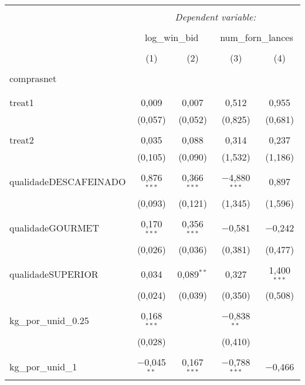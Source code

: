 
\begin{table}[!htbp] \centering 
  \caption{} 
  \label{} 
\begin{tabular}{@{\extracolsep{5pt}}lcccc} 
\\[-1.8ex]\hline 
\hline \\[-1.8ex] 
 & \multicolumn{4}{c}{\textit{Dependent variable:}} \\ 
\cline{2-5} 
\\[-1.8ex] & \multicolumn{2}{c}{log\_win\_bid} & \multicolumn{2}{c}{num\_forn\_lances} \\ 
\\[-1.8ex] & (1) & (2) & (3) & (4)\\ 
\hline \\[-1.8ex] 
 comprasnet &  &  &  &  \\ 
  &  &  &  &  \\ 
  & & & & \\ 
 treat1 & 0,009 & 0,007 & 0,512 & 0,955 \\ 
  & (0,057) & (0,052) & (0,825) & (0,681) \\ 
  & & & & \\ 
 treat2 & 0,035 & 0,088 & 0,314 & 0,237 \\ 
  & (0,105) & (0,090) & (1,532) & (1,186) \\ 
  & & & & \\ 
 qualidadeDESCAFEINADO & 0,876$^{***}$ & 0,366$^{***}$ & $-$4,880$^{***}$ & 0,897 \\ 
  & (0,093) & (0,121) & (1,345) & (1,596) \\ 
  & & & & \\ 
 qualidadeGOURMET & 0,170$^{***}$ & 0,356$^{***}$ & $-$0,581 & $-$0,242 \\ 
  & (0,026) & (0,036) & (0,381) & (0,477) \\ 
  & & & & \\ 
 qualidadeSUPERIOR & 0,034 & 0,089$^{**}$ & 0,327 & 1,400$^{***}$ \\ 
  & (0,024) & (0,039) & (0,350) & (0,508) \\ 
  & & & & \\ 
 kg\_por\_unid\_0.25 & 0,168$^{***}$ &  & $-$0,838$^{**}$ &  \\ 
  & (0,028) &  & (0,410) &  \\ 
  & & & & \\ 
 kg\_por\_unid\_1 & $-$0,045$^{**}$ & 0,167$^{***}$ & $-$0,788$^{***}$ & $-$0,466 \\ 

\end{tabular}
\end{table}
